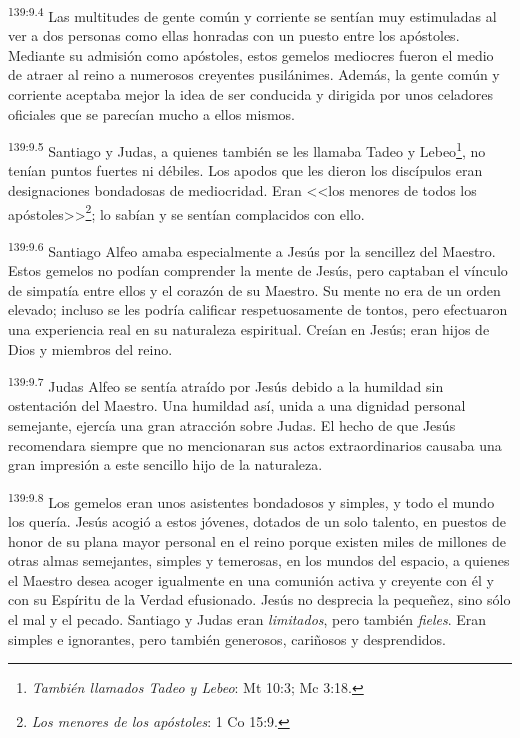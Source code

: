 \par 
\textsuperscript{139:9.4} Las multitudes de gente común y corriente se sentían muy estimuladas al ver a dos personas como ellas honradas con un puesto entre los apóstoles. Mediante su admisión como apóstoles, estos gemelos mediocres fueron el medio de atraer al reino a numerosos creyentes pusilánimes. Además, la gente común y corriente aceptaba mejor la idea de ser conducida y dirigida por unos celadores oficiales que se parecían mucho a ellos mismos.

\par 
\textsuperscript{139:9.5} Santiago y Judas, a quienes también se les llamaba Tadeo y Lebeo\footnote{\textit{También llamados Tadeo y Lebeo}: Mt 10:3; Mc 3:18.}, no tenían puntos fuertes ni débiles. Los apodos que les dieron los discípulos eran designaciones bondadosas de mediocridad. Eran <<los menores de todos los apóstoles>>\footnote{\textit{Los menores de los apóstoles}: 1 Co 15:9.}; lo sabían y se sentían complacidos con ello.

\par 
\textsuperscript{139:9.6} Santiago Alfeo amaba especialmente a Jesús por la sencillez del Maestro. Estos gemelos no podían comprender la mente de Jesús, pero captaban el vínculo de simpatía entre ellos y el corazón de su Maestro. Su mente no era de un orden elevado; incluso se les podría calificar respetuosamente de tontos, pero efectuaron una experiencia real en su naturaleza espiritual. Creían en Jesús; eran hijos de Dios y miembros del reino.

\par 
\textsuperscript{139:9.7} Judas Alfeo se sentía atraído por Jesús debido a la humildad sin ostentación del Maestro. Una humildad así, unida a una dignidad personal semejante, ejercía una gran atracción sobre Judas. El hecho de que Jesús recomendara siempre que no mencionaran sus actos extraordinarios causaba una gran impresión a este sencillo hijo de la naturaleza.

\par 
\textsuperscript{139:9.8} Los gemelos eran unos asistentes bondadosos y simples, y todo el mundo los quería. Jesús acogió a estos jóvenes, dotados de un solo talento, en puestos de honor de su plana mayor personal en el reino porque existen miles de millones de otras almas semejantes, simples y temerosas, en los mundos del espacio, a quienes el Maestro desea acoger igualmente en una comunión activa y creyente con él y con su Espíritu de la Verdad efusionado. Jesús no desprecia la pequeñez, sino sólo el mal y el pecado. Santiago y Judas eran \textit{limitados}, pero también \textit{fieles}. Eran simples e ignorantes, pero también generosos, cariñosos y desprendidos.


